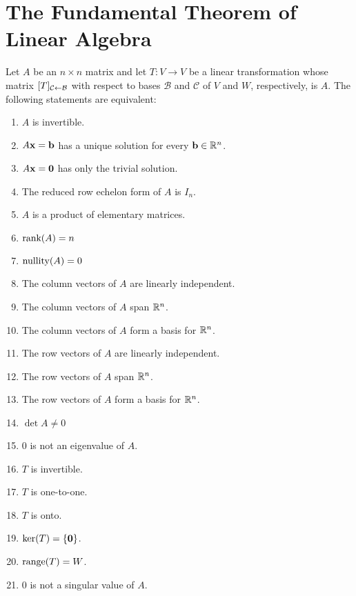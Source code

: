 \documentclass[../m073main.tex]{subfiles}
\begin{document}
\appendix\chapter{The Fundamental Theorem of Linear Algebra}

Let $A$ be an $n\times n$ matrix and let $T : V \to V$ be a linear transformation whose matrix $[T]_{\mathcal{C} \leftarrow \mathcal{B}}$ with respect to bases $\mathcal{B}$ and $\mathcal{C}$ of $V$ and $W$, respectively, is $A$.
The following statements are equivalent: 
\begin{enumerate}[label=(\alph*)]	
	\item $A$ is invertible.
	\item $A\mathbf{x} = \mathbf{b}$ has a unique solution for every $\mathbf{b} \in \mathbb{R}^n$.
	\item $A\mathbf{x} = \mathbf{0}$ has only the trivial solution.
	\item The reduced row echelon form of $A$ is $I_n$.
	\item $A$ is a product of elementary matrices.
	\item $\textrm{rank}(A) = n$
	\item $\textrm{nullity}(A) = 0$
	\item The column vectors of $A$ are linearly independent.
	\item The column vectors of $A$ span $\mathbb{R}^n$.
	\item The column vectors of $A$ form a basis for $\mathbb{R}^n$.
	\item The row vectors of $A$ are linearly independent.
	\item The row vectors of $A$ span $\mathbb{R}^n$.
	\item The row vectors of $A$ form a basis for $\mathbb{R}^n$.
	\item $\det A \neq 0$
	\item 0 is not an eigenvalue of $A$.
	\item $T$ is invertible.
	\item $T$ is one-to-one.
	\item $T$ is onto.
	\item $\textrm{ker}(T) = \{\mathbf{0}\}$.
	\item $\textrm{range}(T) = W$.
	\item 0 is not a singular value of $A$.
\end{enumerate}
\end{document}
